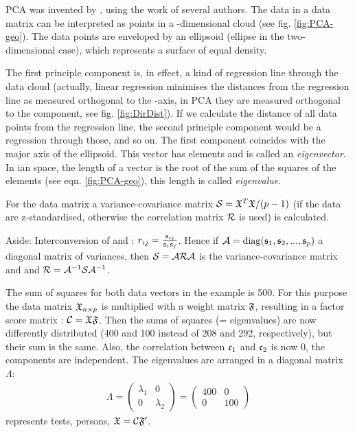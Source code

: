 \begin{refsection}
PCA was invented by  \parencite{Hot-33}, using the work of several authors. The data in a data matrix  can be interpreted as points in a -dimensional cloud (see fig. \ref{fig:PCA-geo}). The data points are enveloped by an ellipsoid (ellipse in the two-dimensional case), which represents a surface of equal density.

The first principle component is, in effect, a kind of regression line through the data cloud (actually, linear regression minimises the distances from the regression line as measured orthogonal to the -axis, in \acs{PCA} they are measured orthogonal to the component, see fig. \ref{fig:DirDist}). If we calculate the distance of all data points from the regression line, the second principle component would be a regression through those, and so on. The first component coincides with the major axis of the ellipsoid. This vector has  elements and is called an \emph{eigenvector}. In ian space, the length of a vector is the root of the sum of the squares of the elements (see eqn. \ref{fig:PCA-geo}), this length is called \emph{eigenvalue}.

For the data matrix a variance-covariance matrix \(\mathcal{S} = \mathfrak{X}^T\mathfrak{X} / (p-1) \) (if the data are z-standardised, otherwise the correlation matrix \(\mathcal{R} \) is used) is calculated.

Aside: Interconversion of  and : \(r_{ij} = \frac{\mathfrak{s}_{ij}}{\mathfrak{s}_i \mathfrak{s}_j} \). Hence if \(\mathcal{A} = \operatorname{diag}(\mathfrak{s}_1, \mathfrak{s}_2, ... , \mathfrak{s}_p) \) a diagonal matrix of variances, then \(\mathcal{S} = \mathcal{A}\mathcal{R}\mathcal{A} \) is the variance-covariance matrix and and \(\mathcal{R} = \mathcal{A}^{-1} \mathcal{S} \mathcal{A}^{-1} \).

The sum of squares for both data vectors in the example is \num{500}. For this purpose the data matrix \(\mathfrak{X}_{n \times p} \) is multiplied with a weight matrix \(\mathfrak{F} \), resulting in a factor score matrix : \(\mathcal{C} = \mathfrak{X} \mathfrak{F} \). Then the sums of squares (= eigenvalues) are now differently distributed (\num{400} and \num{100} instead of \num{208} and \num{292}, respectively), but their sum is the same. Also, the correlation between \(\mathfrak{c}_1 \) and \(\mathfrak{c}_2 \) is now \num{0}, the components are independent. The eigenvalues are arranged in a diagonal matrix \(\Lambda \):
\begin{gather}
   \Lambda = \begin{pmatrix} \lambda_1 & 0 \\ 0 & \lambda_2 \end{pmatrix} =
  \begin{pmatrix} 400 & 0 \\ 0 & 100 \end{pmatrix}
\end{gather}
 represents tests,  persons, \(\mathfrak{X} = \mathcal{C} \mathfrak{F}' \).


\end{refsection}
